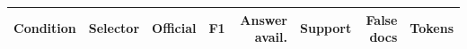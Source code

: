 \begin{tabular}{llrrrrrr}
\toprule
Condition & Selector & Official & F1 & Answer avail. & Support & False docs & Tokens \\
\midrule
\bottomrule
\end{tabular}

